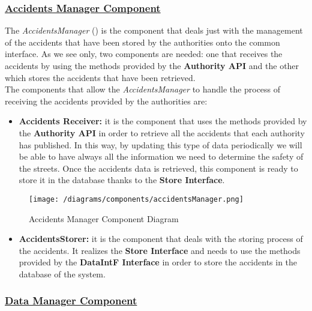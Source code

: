 		\subsubsection[Accidents Manager Component]{\hyperlink{toc}{Accidents Manager Component}}
			\label{sec:accidentsManagerComponent}
			
			The \emph{AccidentsManager} () is the component that deals just with the management of the accidents that have been stored by the authorities onto the common interface. As we see only, two components are needed: one that receives the accidents by using the methods provided by the \textbf{Authority API} and the other which stores the accidents that have been retrieved.\\
			
			The components that allow the \emph{AccidentsManager} to handle the process of receiving the accidents provided by the authorities are:
			
			\begin{itemize}
				\item \textbf{Accidents Receiver:} it is the component that uses the methods provided by the \textbf{Authority API} in order to retrieve all the accidents that each authority has published. In this way, by updating this type of data periodically we will be able to have always all the information we need to determine the safety of the streets. Once the accidents data is retrieved, this component is ready to store it in the database thanks to the \textbf{Store Interface}.
			\end{itemize}
			
			\begin{figure}[ht]
				\centering
				\texttt{[image: /diagrams/components/accidentsManager.png]}
				\caption{\label{fig:accidentsManagerComp} Accidents Manager Component Diagram}
			\end{figure}
		
			\begin{itemize}
				\item \textbf{AccidentsStorer:} it is the component that deals with the storing process of the accidents. It realizes the \textbf{Store Interface} and needs to use the methods provided by the \textbf{DataIntF Interface} in order to store the accidents in the database of the system.
			\end{itemize}
		
		\subsubsection[Data Manager Component]{\hyperlink{toc}{Data Manager Component}}
			\label{sec:dataManagerComponent}
			

